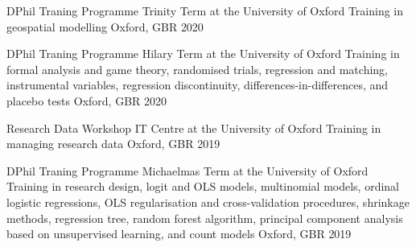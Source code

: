





\vspace{1mm}

\begin{cvhonors}
\cvhonor
{DPhil Traning Programme Trinity Term at the University of Oxford} 
{Training in geospatial modelling} 
{Oxford, GBR}
{2020}
\end{cvhonors}

\vspace{1mm}

\begin{cvhonors}
\cvhonor
{DPhil Traning Programme Hilary Term at the University of Oxford} 
{Training in formal analysis and game theory, randomised trials, regression and matching, instrumental variables, regression discontinuity, differences-in-differences, and placebo tests} 
{Oxford, GBR}
{2020}
\end{cvhonors}

\vspace{1mm}

\begin{cvhonors}
\cvhonor
{Research Data Workshop IT Centre at the University of Oxford} 
{Training in managing research data} 
{Oxford, GBR}
{2019}
\end{cvhonors}

\vspace{1mm}

\begin{cvhonors}
\cvhonor
{DPhil Traning Programme Michaelmas Term at the University of Oxford}
{Training in research design, logit and OLS models, multinomial models, ordinal logistic regressions,  OLS regularisation and cross-validation procedures, shrinkage methods, regression tree, random forest algorithm, principal component analysis based on unsupervised learning, and count models}
{Oxford, GBR}
{2019}
\end{cvhonors}

